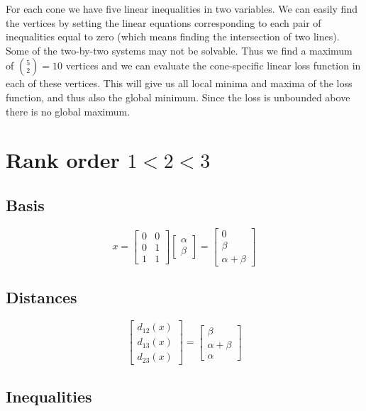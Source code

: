\documentclass[
  12pt,
  letterpaper,
  DIV=11,
  numbers=noendperiod]{scrartcl}
\begin{document}
For each cone we have five linear inequalities in two variables. We can
easily find the vertices by setting the linear equations corresponding
to each pair of inequalities equal to zero (which means finding the
intersection of two lines). Some of the two-by-two systems may not be
solvable. Thus we find a maximum of \(\binom{5}{2}=10\) vertices and we
can evaluate the cone-specific linear loss function in each of these
vertices. This will give us all local minima and maxima of the loss
function, and thus also the global minimum. Since the loss is unbounded
above there is no global maximum.

\pagebreak

\section{\texorpdfstring{Rank order
\(1<2<3\)}{Rank order 1\textless2\textless3}}\label{rank-order-123}

\subsection{Basis}\label{basis}

\[
x=\begin{bmatrix}
0&0\\
0&1\\
1&1
\end{bmatrix}
\begin{bmatrix}
\alpha\\
\beta
\end{bmatrix}=
\begin{bmatrix}
0\\
\beta\\
\alpha+\beta
\end{bmatrix}
\]

\subsection{Distances}\label{distances}

\[
\begin{bmatrix}
d_{12}(x)\\
d_{13}(x)\\
d_{23}(x)
\end{bmatrix}
=
\begin{bmatrix}
\beta\\
\alpha+\beta\\
\alpha
\end{bmatrix}
\]

\subsection{Inequalities}\label{inequalities}
\end{document}
